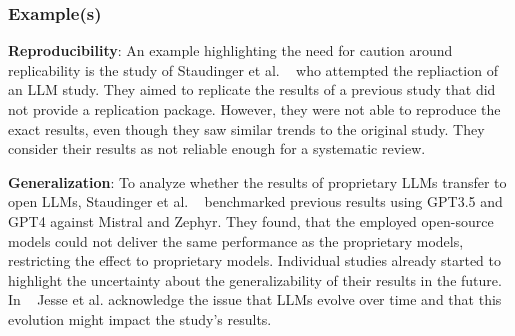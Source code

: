 \subsubsection{Example(s)}
\textbf{Reproducibility}:
An example highlighting the need for caution around replicability is the study of Staudinger et al. ~\cite{DBLP:conf/sigir-ap/StaudingerKPLH24} who attempted the repliaction of an LLM study. They aimed to replicate the results of a previous study that did not provide a replication package. However, they were not able to reproduce the exact results, even though they saw similar trends to the original study. They consider their results as not reliable enough for a systematic review.

\textbf{Generalization}:
To analyze whether the results of proprietary LLMs transfer to open LLMs, Staudinger et al. ~\cite{DBLP:conf/sigir-ap/StaudingerKPLH24} benchmarked previous results using GPT3.5 and GPT4 against Mistral and Zephyr. They found, that the employed open-source models could not deliver the same performance as the proprietary models, restricting the effect to proprietary models.
Individual studies already started to highlight the uncertainty about the generalizability of their results in the future. In ~\cite{DBLP:conf/msr/JesseADM23} Jesse et al. acknowledge the issue that LLMs evolve over time and that this evolution might impact the study's results.

